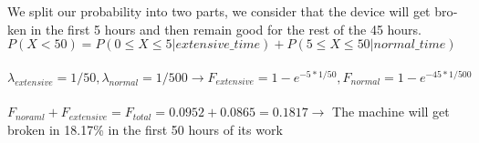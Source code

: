 \begin{latin}
    \noindent
    We split our probability into two parts, we consider that the device will get broken in the first 5 hours and then remain good for the rest of the 45 hours. \\
    $P(X < 50) = P(0 \leq X \leq 5 | extensive\_time) + P(5 \leq X \leq 50 | normal\_time)$ \\\\
    $\lambda_{extensive} = 1/50, \lambda_{normal} = 1/500 \rightarrow F_{extensive} = 1 - e^{-5 * 1/50}, F_{normal} = 1 - e^{-45 * 1/500}$\\\\
    $F_{noraml} + F_{extensive} = F_{total} = 0.0952 + 0.0865 = 0.1817\rightarrow$
     The machine will get broken in 18.17\% in the first 50 hours of its work
\end{latin}
